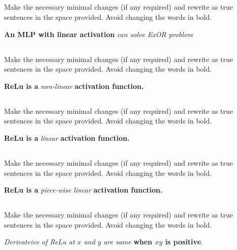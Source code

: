 \begin{frame}
\section{}
Make the necessary minimal changes  (if any required) and rewrite as true sentences in the space provided. Avoid changing the words in bold.

{\bf An MLP with linear activation} {\em can solve ExOR problem}

\end{frame}

\begin{frame}
\section{}
Make the necessary minimal changes  (if any required) and rewrite as true sentences in the space provided. Avoid changing the words in bold.

{\bf ReLu  is a} {\em non-linear} {\bf activation function.}

\end{frame}

\begin{frame}
\section{}
Make the necessary minimal changes  (if any required) and rewrite as true sentences in the space provided. Avoid changing the words in bold.

{\bf ReLu  is a} {\em linear} {\bf activation function.}

\end{frame}

\begin{frame}
\section{}
Make the necessary minimal changes  (if any required) and rewrite as true sentences in the space provided. Avoid changing the words in bold.

{\bf ReLu  is a} {\em piece-wise linear} {\bf activation function.}

\end{frame}

\begin{frame}
\section{}
Make the necessary minimal changes  (if any required) and rewrite as true sentences in the space provided. Avoid changing the words in bold.

{\em Derivateive of ReLu at $x$ and $y$} {\em are same} {\bf when $xy$ is positive}.
\end{frame}
